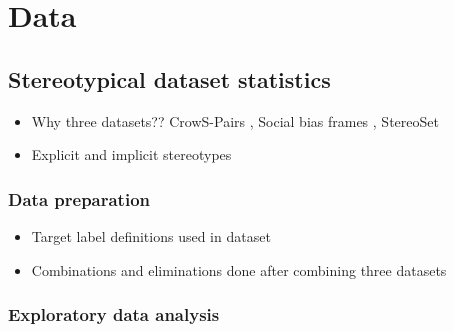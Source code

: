 \chapter{Data}
\section{Stereotypical dataset statistics}

\begin{itemize}
    \item Why three datasets?? CrowS-Pairs \cite{nangia2020crows}, Social bias frames \cite{sap2019social}, StereoSet \cite{nadeem2020stereoset}
    \item Explicit and implicit stereotypes
\end{itemize}
\subsection{Data preparation}
    \begin{itemize}
        \item Target label definitions used in dataset
        \item Combinations and eliminations done after combining three datasets
    \end{itemize}
\subsection{Exploratory data analysis}